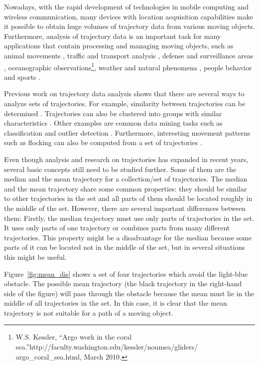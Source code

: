 Nowadays, with the rapid development of technologies in mobile computing and wireless communication, many devices with location acquisition capabilities make it possible to obtain huge volumes of trajectory data from various moving objects.
Furthermore, analysis of trajectory data is an important task for many applications that contain processing and managing moving objects, such as animal movements \cite{Calenge:2009,Nams:2004,Herb:2010,Brillinger:2001}, traffic and transport analysis \cite{Yunyao:1998}, defense and surveillance areas \cite{Ng:2001}, oceanographic observations\footnote{W.S. Kessler, ``Argo work in the coral sea.''http://faculty.washington.edu/kessler/noumea/gliders/\\argo\_coral\_sea.html, March 2010.}, weather and natural phenomena \cite{Hubert:1957}, people behavior \cite{Fuentes:2001} and sports \cite{Brillinger:2007,Iwase:2002}.

Previous work on trajectory data analysis shows that there are several ways to analyze sets of trajectories.
For example, similarity between trajectories can be determined \cite{VlachosGunopoulos:2002,Lin:2005,Kreveld:2007}.
Trajectories can also be clustered into groups with similar characteristics \cite{Gaffney:1999,Lee:2007,Nanni:2006,Buchin:2009}.
Other examples are common data mining tasks such as classification \cite{Lee:2008,Garcia:2006} and outlier detection \cite{LeeHan:2008}.
Furthermore, interesting movement patterns such as flocking can also be computed from a set of trajectories \cite{Gudmundsson:2006,Buchin:2008,Gudmundsson:2007,Laube:2006}.

Even though analysis and research on trajectories has expanded in recent years, several basic concepts still need to be studied further.
Some of them are the median and the mean trajectory for a collection/set of trajectories.
The median and the mean trajectory share some common properties: they should be similar to other trajectories in the set and all parts of them should be located roughly in the middle of the set.
However, there are several important differences between them:
Firstly, the median trajectory must use only parts of trajectories in the set. 
It uses only parts of one trajectory or combines parts from many different trajectories.
This property might be a disadvantage for the median because some parts of it can be located not in the middle of the set, but in several situations this might be useful.

Figure~\ref{fig:mean_dis} shows a set of four trajectories which avoid the light-blue obstacle.
The possible mean trajectory (the black trajectory in the right-hand side of the figure) will pass through the obstacle because the mean must lie in the middle of all trajectories in the set.
In this case, it is clear that the mean trajectory is not suitable for a path of a moving object.

